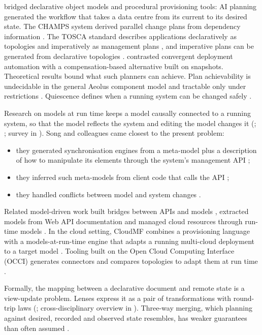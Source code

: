 \citet{maghraoui2006} bridged declarative object models
and procedural provisioning tools: AI planning generated the workflow that takes a data centre from
its current to its desired state. The CHAMPS system derived parallel change plans from dependency
information \citep{keller2004}. The TOSCA standard
describes applications declaratively as topologies and imperatively as management plans
\citep{binz2013}, and imperative plans can be
generated from declarative topologies
\citep{breitenbucher2014}.
\citet{wettinger2014} contrasted convergent
deployment automation with a compensation-based alternative built on snapshots. Theoretical results
bound what such planners can achieve. Plan achievability is undecidable in the general Aeolus
component model and tractable only under restrictions
\citep{cosmo2014}. Quiescence defines when a running
system can be changed safely \citep{kramer1990}.

Research on models at run time keeps a model causally connected to a running system, so that the
model reflects the system and editing the model changes it
(\citealp{blair2009};
\citealp{morin2009}; survey in
\citealp{bencomo2019}). Song and colleagues came closest
to the present problem:

\begin{itemize}
\item
  they generated synchronisation engines from a meta-model plus a description of how to manipulate
  its elements through the system's management API
  \citep{song2010a};
\item
  they inferred such meta-models from client code that calls the API
  \citep{song2010b};
\item
  they handled conflicts between model and system changes
  \citep{song2011}.
\end{itemize}

Related model-driven work built bridges between APIs and models
\citep{izquierdo2012}, extracted models from Web API
documentation \citep{rodriguez2012} and managed
cloud resources through run-time models
\citep{zhang2013}. In the cloud setting, CloudMF
combines a provisioning language with a models-at-run-time engine that adapts a running multi-cloud
deployment to a target model \citep{ferry2018}. Tooling built on the Open Cloud Computing
Interface (OCCI) generates connectors and compares topologies to adapt them at run time
\citep{zalila2019,korte2018,erbel2018,challita2021}.

Formally, the mapping between a declarative document and remote state is a view-update problem.
Lenses express it as a pair of transformations with round-trip laws
(\citealp{foster2007}; cross-disciplinary overview in
\citealp{czarnecki2009}). Three-way merging, which
planning against desired, recorded and observed state resembles, has weaker guarantees than often
assumed \citep{khanna2007}.

